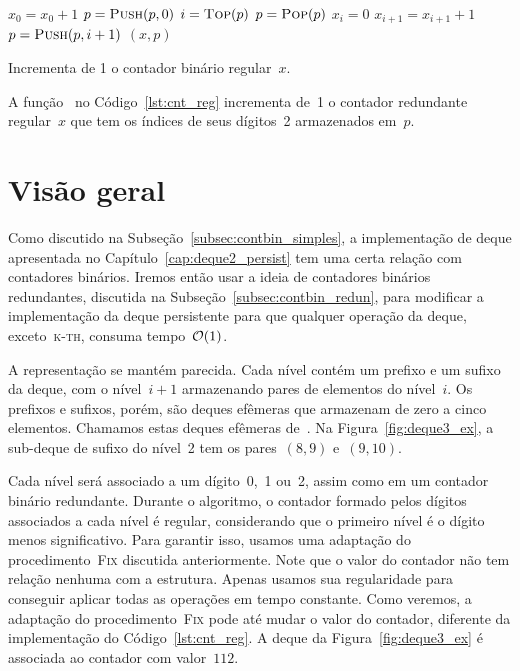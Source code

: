 \documentclass[main.tex]{subfiles}
\begin{document}
\begin{algorithm}
\begin{algorithmic}[1]

    \State $x_0 = x_0 + 1$
        \State $p = \Call{Push}{p, 0}$
    \EndIf
     
        \State $i = \Call{Top}{p}$
        \State $p = \Call{Pop}{p}$
        \State $x_i = 0$
        \State $x_{i+1} = x_{i+1} + 1$
            \State $p = \Call{Push}{p, i + 1}$
        \EndIf
    \EndIf
    \State \Return $(x, p)$
\EndFunction

\end{algorithmic}
\caption{Incrementa de 1 o contador binário regular~$x$. \label{lst:cnt_reg}}
\end{algorithm}

A função~ no Código~\ref{lst:cnt_reg} incrementa de~1 o contador redundante regular~$x$ que tem os índices de seus dígitos~2 armazenados em~$p$.

\section{Visão geral}

Como discutido na Subseção~\ref{subsec:contbin_simples}, a implementação de deque apresentada no Capítulo~\ref{cap:deque2_persist} tem uma certa relação com contadores binários. Iremos então usar a ideia de contadores binários redundantes, discutida na Subseção~\ref{subsec:contbin_redun}, para modificar a implementação da deque persistente para que qualquer operação da deque, exceto~\textsc{k-th}, consuma tempo~$\mathcal{O}(1)$.

A representação se mantém parecida. Cada nível contém um prefixo e um sufixo da deque, com o nível~$i+1$ armazenando pares de elementos do nível~$i$. Os prefixos e sufixos, porém, são deques efêmeras que armazenam de zero a cinco elementos. Chamamos estas deques efêmeras de~. Na Figura~\ref{fig:deque3_ex}, a sub-deque de sufixo do nível~2 tem os pares~$(8, 9)$ e~$(9, 10)$.

Cada nível será associado a um dígito~0,~1 ou~2, assim como em um contador binário redundante. Durante o algoritmo, o contador formado pelos dígitos associados a cada nível é regular, considerando que o primeiro nível é o dígito menos significativo. Para garantir isso, usamos uma adaptação do procedimento~\textsc{Fix} discutida anteriormente. Note que o valor do contador não tem relação nenhuma com a estrutura. Apenas usamos sua regularidade para conseguir aplicar todas as operações em tempo constante. Como veremos, a adaptação do procedimento~\textsc{Fix} pode até mudar o valor do contador, diferente da implementação do Código~\ref{lst:cnt_reg}. A deque da Figura~\ref{fig:deque3_ex} é associada ao contador com valor~$112$.
\end{document}
